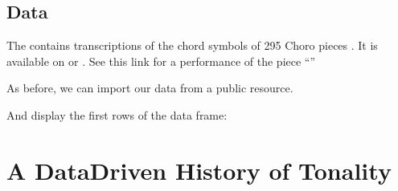 \documentclass[letterpaper,10pt,english]{sphinxmanual}
\begin{document}
\section{Data}
\label{\detokenize{choro:data}}
The  contains transcriptions of the chord symbols
of 295 Choro pieces . It is available on  or .
See this link for a performance of the piece “”

As before, we can import our data from a public resource.

\begin{sphinxVerbatim}[commandchars=\\\{\}]
   \PYGZbs{}
\end{sphinxVerbatim}

And display the first rows of the data frame:

\begin{sphinxVerbatim}[commandchars=\\\{\}]
\end{sphinxVerbatim}


\chapter{A Data\sphinxhyphen{}Driven History of Tonality}
\label{\detokenize{tonality:a-data-driven-history-of-tonality}}\label{\detokenize{tonality::doc}}
\end{document}
